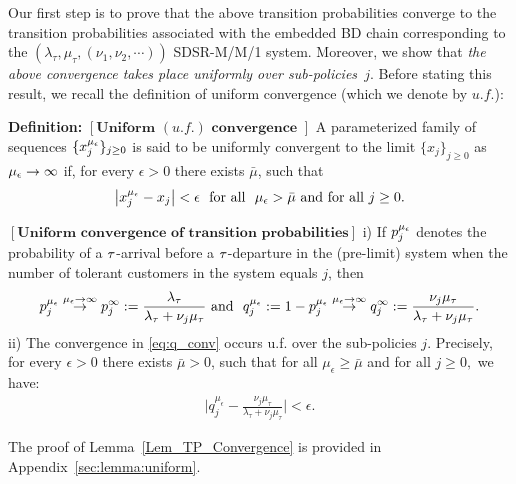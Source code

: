 Our first step is to prove that the above transition probabilities
converge to the transition probabilities associated with the embedded
BD chain corresponding to the
$(\lambda_\tau, \mu_\tau, (\nu_1, \nu_2, \cdots ))$ SDSR-M/M/1
system. Moreover, we show that \emph{the above convergence takes place
  uniformly over sub-policies~$j.$} Before stating this result, we
recall the definition of uniform convergence (which we denote by
$u.f.$):
%

\textbf{Definition:} $\left[\textbf{Uniform
    $(u.f.)$ convergence }\right]$ A parameterized family of sequences
$\{x_{j}^{{\mu_\epsilon}}\}_{j \geq 0}$ is said to be uniformly convergent to
the limit $\{x_j\}_{j \geq 0}$ as ${\mu_\epsilon} \rightarrow \infty$ if, for every
$\epsilon >0$ there exists $\bar{\mu}$, such that
$$
\left| x_{j}^{{\mu_\epsilon}} - x_j \right| < \epsilon \ \ \mbox{for all} \ \
{\mu_\epsilon} > \bar{\mu} \mbox{ and for all } j \geq 0.
$$ 
% 
\begin{lemma}
	\label{Lem_TP_Convergence}
	$\left[\textbf{Uniform convergence of transition
            probabilities}\right]$ i) If $p_j^{\mu_\epsilon}$ denotes the
        probability of a ${\tau}$-arrival before a ${\tau}$-departure in the
        (pre-limit) system when the number of tolerant customers in
        the system equals $j$, then
	\begin{eqnarray}
	\label{eq:q_conv}
	p_j^\mue \stackrel{\mue \to \infty}{\rightarrow} p_j^{\infty} := \frac{\lambda_\t}{\lambda_\tau + \nu_j \mu_\tau} \ \mbox{and } \ q_j^\mue := 1 - p_j^\mue   \stackrel{\mue \to \infty}{\rightarrow} q_j^{\infty}:= \frac{\nu_j \mu_\t}{\lambda_\tau + \nu_j \mu_\tau} . 
	\end{eqnarray}
	\label{lemma:uniform}
	ii) The convergence in \eqref{eq:q_conv} occurs u.f. over the
        sub-policies $j$.  Precisely, for every $\epsilon > 0$ there
        exists $\bar{\mu} > 0$, such that for all
        $\mu_\epsilon \geq \bar{\mu}$ and for all $j \geq 0,$ we have:
	\begin{eqnarray}
	\bigg| q_j^{\mu_\epsilon} - \frac{\nu_j \mu_\tau}{\lambda_\tau + \nu_j \mu_\tau}  \bigg| < \epsilon.
	\end{eqnarray} 
\end{lemma}
The proof of Lemma~\ref{Lem_TP_Convergence} is provided in
Appendix~\ref{sec:lemma:uniform}.


